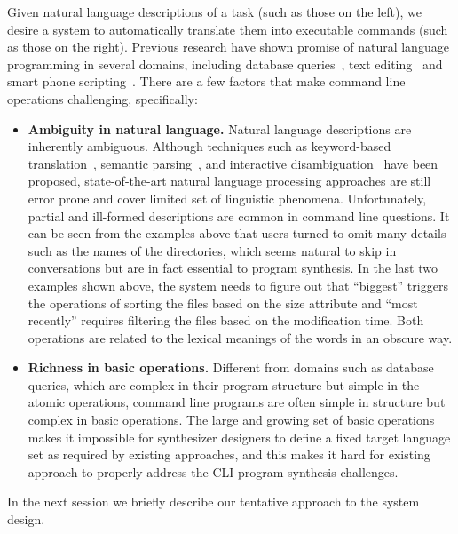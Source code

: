 Given natural language descriptions of a task (such as those on the left), we desire a system to automatically translate them into executable commands (such as those on the right).
Previous research have shown promise of natural language programming in several domains, including database queries~\cite{DBLP:journals/pvldb/LiJ14, DBLP:conf/sigmod/GulwaniM14}, text editing~\cite{DBLP:journals/corr/DesaiGHJKMRR15} and smart phone scripting~\cite{DBLP:conf/mobisys/LeGS13}.
There are a few factors that make command line operations challenging, specifically:
\begin{itemize}
\item \textbf{Ambiguity in natural language.} Natural language descriptions are inherently ambiguous. Although techniques such as keyword-based translation~\cite{DBLP:conf/sigmod/GulwaniM14}, semantic parsing~\citep{Zettlemoyer05learningto}, and interactive disambiguation~\cite{DBLP:journals/pvldb/LiJ14} have been proposed, state-of-the-art natural language processing approaches are still error prone and cover limited set of linguistic phenomena.
Unfortunately, partial and ill-formed descriptions are common in command line questions. It can be seen from the examples above that users turned to omit many details such as the names of the directories, which seems natural to skip in conversations but are in fact essential to program synthesis. In the last two examples shown above, the system needs to figure out that ``biggest'' triggers the operations of sorting the files based on the size attribute and ``most recently'' requires filtering the files based on the modification time. Both operations are related to the lexical meanings of the words in an obscure way.

\item \textbf{Richness in basic operations.} Different from domains such as database queries, which are complex in their program structure but simple in the atomic operations, command line programs are often simple in structure but complex in basic operations. The large and growing set of basic operations makes it impossible for synthesizer designers to define a fixed target language set as required by existing approaches, and this makes it hard for existing approach to properly address the CLI program synthesis challenges.
\end{itemize}

In the next session we briefly describe our tentative approach to the system design.
